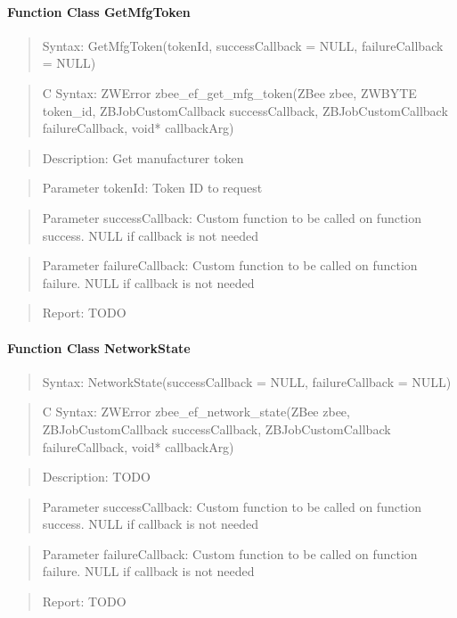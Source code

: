 \paragraph{Function Class GetMfgToken}
\begin{quote}Syntax: GetMfgToken(tokenId, successCallback = NULL, failureCallback = NULL)\end{quote}
\begin{quote}C Syntax: ZWError zbee\_ef\_get\_mfg\_token(ZBee zbee, ZWBYTE token\_id, ZBJobCustomCallback successCallback, ZBJobCustomCallback failureCallback, void* callbackArg)\end{quote}
\begin{quote}Description: Get manufacturer token\end{quote}
\begin{quote}Parameter tokenId: Token ID to request\end{quote}
\begin{quote}Parameter successCallback: Custom function to be called on function success. NULL if callback is not needed\end{quote}
\begin{quote}Parameter failureCallback: Custom function to be called on function failure. NULL if callback is not needed\end{quote}
\begin{quote}Report: TODO\end{quote}

\paragraph{Function Class NetworkState}
\begin{quote}Syntax: NetworkState(successCallback = NULL, failureCallback = NULL)\end{quote}
\begin{quote}C Syntax: ZWError zbee\_ef\_network\_state(ZBee zbee, ZBJobCustomCallback successCallback, ZBJobCustomCallback failureCallback, void* callbackArg)\end{quote}
\begin{quote}Description: TODO\end{quote}
\begin{quote}Parameter successCallback: Custom function to be called on function success. NULL if callback is not needed\end{quote}
\begin{quote}Parameter failureCallback: Custom function to be called on function failure. NULL if callback is not needed\end{quote}
\begin{quote}Report: TODO\end{quote}

